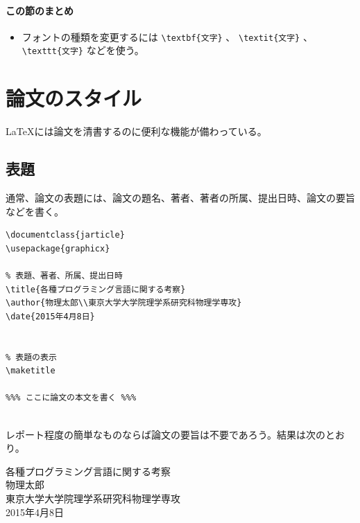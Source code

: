 \paragraph{この節のまとめ}

\begin{itemize}
\item フォントの種類を変更するには \verb|\textbf{文字}| 、 \verb|\textit{文字}| 、\verb|\texttt{文字}| などを使う。
\end{itemize}


\section{論文のスタイル}
\label{sec:latex:style}

\LaTeX には論文を清書するのに便利な機能が備わっている。


\subsection{表題}
\label{sec:latex:title}

通常、論文の表題には、論文の題名、著者、著者の所属、提出日時、論文の要旨などを書く。
\begin{reidai}
\begin{verbatim}
\documentclass{jarticle}
\usepackage{graphicx}

% 表題、著者、所属、提出日時
\title{各種プログラミング言語に関する考察}
\author{物理太郎\\東京大学大学院理学系研究科物理学専攻}
\date{2015年4月8日}


% 表題の表示
\maketitle

%%% ここに論文の本文を書く %%%


\end{verbatim}
\end{reidai}
レポート程度の簡単なものならば論文の要旨は不要であろう。結果は次のとおり。
\begin{kekka}
  \begin{center}
    {\Large 各種プログラミング言語に関する考察} \\[1.5em]
    物理太郎\\
    東京大学大学院理学系研究科物理学専攻 \\
    2015年4月8日
  \end{center}
\end{kekka}

